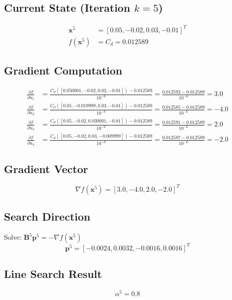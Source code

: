 \documentclass{article}
\begin{document}
\subsection{Current State (Iteration $k=5$)}
\begin{align}
\mathbf{x}^5 &= [0.05, -0.02, 0.03, -0.01]^T \\
f(\mathbf{x}^5) &= C_d = 0.012589
\end{align}

\subsection{Gradient Computation}
\begin{align}
\frac{\partial f}{\partial u_1} &= \frac{C_d([0.050001, -0.02, 0.03, -0.01]) - 0.012589}{10^{-6}} = \frac{0.012592 - 0.012589}{10^{-6}} = 3.0 \\
\frac{\partial f}{\partial u_2} &= \frac{C_d([0.05, -0.019999, 0.03, -0.01]) - 0.012589}{10^{-6}} = \frac{0.012585 - 0.012589}{10^{-6}} = -4.0 \\
\frac{\partial f}{\partial u_3} &= \frac{C_d([0.05, -0.02, 0.030001, -0.01]) - 0.012589}{10^{-6}} = \frac{0.012591 - 0.012589}{10^{-6}} = 2.0 \\
\frac{\partial f}{\partial u_4} &= \frac{C_d([0.05, -0.02, 0.03, -0.009999]) - 0.012589}{10^{-6}} = \frac{0.012587 - 0.012589}{10^{-6}} = -2.0
\end{align}

\subsection{Gradient Vector}
\begin{equation}
\nabla f(\mathbf{x}^5) = [3.0, -4.0, 2.0, -2.0]^T
\end{equation}

\subsection{Search Direction}
Solve: $\mathbf{B}^5 \mathbf{p}^5 = -\nabla f(\mathbf{x}^5)$
\begin{equation}
\mathbf{p}^5 = [-0.0024, 0.0032, -0.0016, 0.0016]^T
\end{equation}

\subsection{Line Search Result}
\begin{equation}
\alpha^5 = 0.8
\end{equation}
\end{document}

